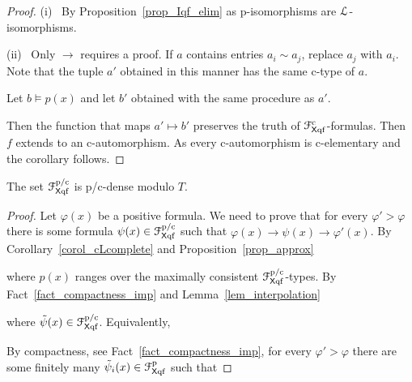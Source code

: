 \documentclass{amsproc}
\begin{document}
{\begin{proof}
  (i) \ 
  By Proposition~\ref{prop_Iqf_elim} as p-isomorphisms are ${\EuScript L}$-isomorphisms.


  (ii) \ 
  Only $\rightarrow$ requires a proof.
  If $a$ contains entries $a_i\sim a_j$, replace $a_j$ with $a_i$.
  Note that the tuple $a'$ obtained in this manner has the same c-type of $a$.
 
  Let $b\models p(x)$ and let $b'$ obtained with the same procedure as $a'$.
  
  Then the function that maps $a'\mapsto b'$ preserves the truth of ${\EuScript F}^{\rm c}_{{\sf X}{\rm qf}}$-formulas.
  Then $f$ extends to an c-automorphism.
  As every c-automorphism is c-elementary and the corollary follows.
\end{proof}

\begin{proposition}\label{prop_cLHapprox1}
  The set ${\EuScript F}^{\rm p/c}_{{\sf X}{\rm qf}}$ is p/c-dense modulo $T$.
\end{proposition}

\begin{proof}
  Let $\varphi(x)$ be a positive formula.
  We need to prove that for every $\varphi'>\varphi$ there is some formula $\psi(x)\in{\EuScript F}^{\rm p/c}_{{\sf X}{\rm qf}}$ such that $\varphi(x)\rightarrow\psi(x)\rightarrow\varphi'(x)$.
  By Corollary~\ref{corol_cLcomplete} and Proposition~\ref{prop_approx}


  where $p(x)$ ranges over the maximally consistent ${\EuScript F}^{\rm p/c}_{{\sf X}{\rm qf}}$-types.
  By Fact~\ref{fact_compactness_imp} and Lemma~\ref{lem_interpolation}


  where $\tilde{\psi}(x)\in{\EuScript F}^{\rm p/c}_{{\sf X}{\rm qf}}$.
  Equivalently,


  By compactness, see Fact~\ref{fact_compactness_imp}, for every $\varphi'>\varphi$ there are some finitely many $\tilde{\psi}_i(x)\in{\EuScript F}^{\rm p}_{{\sf X}{\rm qf}}$ such that

  \ceq{\hfill\varphi'(x)}{\leftarrow}{\bigwedge_{i=1,\dots,n}\tilde{\psi}_i(x)\ \ \leftarrow\ \ \varphi(x)}


\end{proof}}
\end{document}
